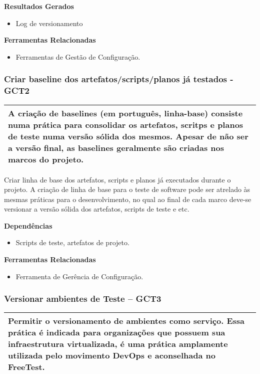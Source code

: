\textbf{Resultados Gerados}
\begin{itemize}
    \item Log de versionamento
\end{itemize}

\textbf{Ferramentas Relacionadas }
\begin{itemize}
    \item Ferramentas de Gestão de Configuração.
\end{itemize}

\subsubsection{Criar baseline dos artefatos/scripts/planos já testados - GCT2 }
\label{sec:gct2}

\begin{table}[!ht]
\centering
\begin{tabular}{|p{130mm}|}
\hline
A criação de baselines (em português, linha-base) consiste numa prática para consolidar os artefatos, scritps e planos de teste numa versão sólida dos mesmos. Apesar de não ser a versão final, as baselines geralmente são criadas nos marcos do projeto. \\ 
\hline
\end{tabular}
\end{table}

Criar linha de base dos artefatos, scripts e planos já executados durante o projeto. A criação de linha de base para o teste de software pode ser atrelado às mesmas práticas para o desenvolvimento, no qual ao final de cada marco deve-se versionar a versão sólida dos artefatos, scripts de teste e etc.

\textbf{Dependências }
\begin{itemize}
    \item Scripts de teste, artefatos de projeto.
\end{itemize}

\textbf{ Ferramentas Relacionadas}
\begin{itemize}
    \item Ferramenta de Gerência de Configuração.
\end{itemize}

\subsubsection{Versionar ambientes de Teste – GCT3 }
\label{sec:gct3}

\begin{table}[!ht]
\centering
\begin{tabular}{|p{130mm}|}
\hline
Permitir o versionamento de ambientes como serviço. Essa prática é indicada para organizações que possuem sua infraestrutura virtualizada, é uma prática amplamente utilizada pelo movimento DevOps e aconselhada no FreeTest. \\ 
\hline
\end{tabular}
\end{table}

